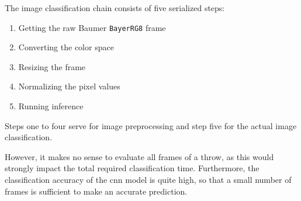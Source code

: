 The image classification chain consists of five serialized steps:
\begin{enumerate}
  \item Getting the raw Baumer \texttt{BayerRG8} frame
  \item Converting the color space
  \item Resizing the frame
  \item Normalizing the pixel values
  \item Running inference
\end{enumerate}

Steps one to four serve for image preprocessing and step five for the actual image classification.

However, it makes no sense to evaluate all frames of a throw, as this would strongly impact the total required classification time.
Furthermore, the classification accuracy of the \acrshort{cnn} model is quite high, so that a small number of frames is sufficient to make an accurate prediction.


